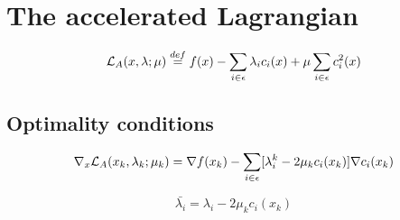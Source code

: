 \chapter{The accelerated Lagrangian}

	\cite{Wright}
	
	\begin{equation}
		\mathcal{L}_A(x,\lambda;\mu) \overset{def}{=} f(x) - \sum_{i \in \epsilon}\lambda_ic_i(x) + \mu \sum_{i \in \epsilon}c_i^2(x)
	\end{equation}

	\section{Optimality conditions}
		\begin{equation}
			\nabla_x \mathcal{L}_A(x_k,\lambda_k;\mu_k) = \nabla f(x_k) - \sum_{i \in \epsilon} [\lambda_i^k - 2\mu_k c_i(x_k)] \nabla c_i(x_k)
		\end{equation}
		
		\begin{equation}
			\bar{\lambda_i} = \lambda_i - 2\mu_k c_i(x_k)
		\end{equation}
		
		